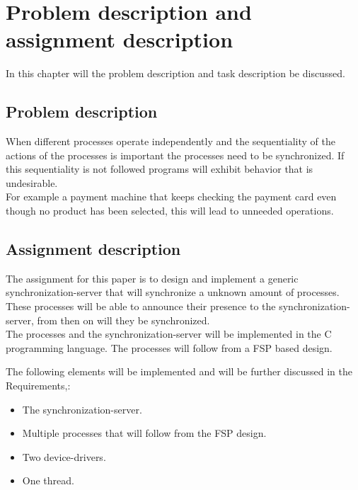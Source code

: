 \hypertarget{problem-description-and-assignment-description}{%
\chapter{Problem description and assignment
description}\label{problem-description-and-assignment-description}}

In this chapter will the problem description and task description be
discussed.

\hypertarget{problem-description}{%
\section{Problem description}\label{problem-description}}

When different processes operate independently and the sequentiality of
the actions of the processes is important the processes need to be
synchronized. If this sequentiality is not followed programs will
exhibit behavior that is undesirable.\\
For example a payment machine that keeps checking the payment card even
though no product has been selected, this will lead to unneeded
operations.

\hypertarget{assignment-description}{%
\section{Assignment description}\label{assignment-description}}

The assignment for this paper is to design and implement a generic
synchronization-server that will synchronize a unknown amount of
processes. These processes will be able to announce their presence to
the synchronization-server, from then on will they be synchronized.\\
The processes and the synchronization-server will be implemented in the
C programming language. The processes will follow from a FSP based
design.

The following elements will be implemented and will be further discussed
in the Requirements,:

\begin{itemize}
\tightlist
\item
  The synchronization-server.
\item
  Multiple processes that will follow from the FSP design.
\item
  Two device-drivers.
\item
  One thread.
\end{itemize}
